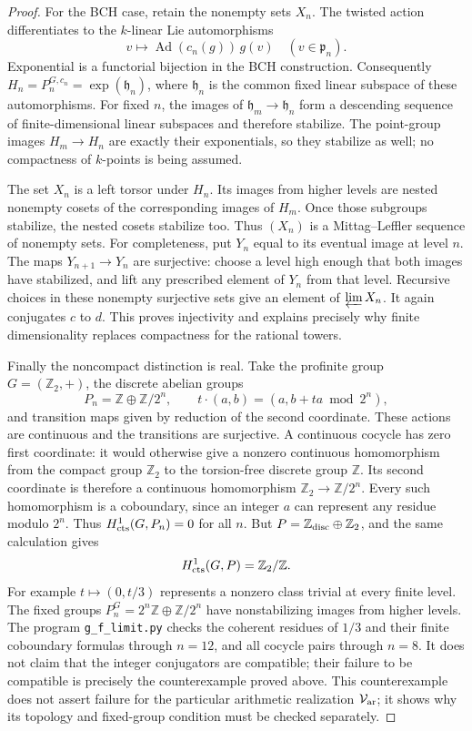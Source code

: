 \begin{proof}
For the BCH case, retain the nonempty sets $X_n$. The twisted
action differentiates to the $k$-linear Lie automorphisms
\[
       v\longmapsto\operatorname{Ad}(c_n(g))\,g(v)
                          \quad(v\in\mathfrak p_n).
\]
Exponential is a functorial bijection in the BCH construction.
Consequently
$H_n=P_n^{G,c_n}=\exp(\mathfrak h_n)$, where
$\mathfrak h_n$ is the common fixed linear subspace of these
automorphisms. For fixed $n$, the images of
$\mathfrak h_m\to\mathfrak h_n$ form a descending sequence
of finite-dimensional linear subspaces and therefore stabilize.
The point-group images $H_m\to H_n$ are exactly their
exponentials, so they stabilize as well; no compactness of
$k$-points is being assumed.

The set $X_n$ is a left torsor under $H_n$. Its images from
higher levels are nested nonempty cosets of the corresponding
images of $H_m$. Once those subgroups stabilize, the nested
cosets stabilize too. Thus $(X_n)$ is a Mittag--Leffler sequence
of nonempty sets. For completeness, put $Y_n$ equal to its
eventual image at level $n$. The maps
$Y_{n+1}\to Y_n$ are surjective: choose a level high enough
that both images have stabilized, and lift any prescribed
element of $Y_n$ from that level. Recursive choices in these
nonempty surjective sets give an element of $\varprojlim X_n$.
It again conjugates $c$ to $d$. This proves injectivity and
explains precisely why finite dimensionality replaces compactness
for the rational towers.

Finally the noncompact distinction is real. Take the profinite
group $G=(\mathbb Z_2,+)$, the discrete abelian groups
\[
 P_n=\mathbb Z\oplus\mathbb Z/2^n,
 \qquad t\cdot(a,b)=(a,b+ta\bmod 2^n),
\]
and transition maps given by reduction of the second coordinate.
These actions are continuous and the transitions are surjective.
A continuous cocycle has zero first coordinate: it would otherwise
give a nonzero continuous homomorphism from the compact group
$\mathbb Z_2$ to the torsion-free discrete group $\mathbb Z$.
Its second coordinate is therefore a continuous homomorphism
$\mathbb Z_2\to\mathbb Z/2^n$. Every such homomorphism is a
coboundary, since an integer $a$ can represent any residue
modulo $2^n$. Thus $H^1_{\rm cts}(G,P_n)=0$ for all $n$.
But $P=\mathbb Z_{\rm disc}\oplus\mathbb Z_2$, and the same
calculation gives
\[
               H^1_{\rm cts}(G,P)=\mathbb Z_2/\mathbb Z.
\]
For example $t\mapsto(0,t/3)$ represents a nonzero class
trivial at every finite level. The fixed groups
$P_n^G=2^n\mathbb Z\oplus\mathbb Z/2^n$ have nonstabilizing
images from higher levels. The program \texttt{g\_f\_limit.py}
checks the coherent residues of $1/3$ and their finite
coboundary formulas through $n=12$, and all cocycle pairs
through $n=8$. It does not claim that the integer conjugators
are compatible; their failure to be compatible is precisely
the counterexample proved above. This counterexample does not assert
failure for the particular arithmetic realization
$\mathcal V_{\rm ar}$; it shows why its topology and fixed-group
condition must be checked separately.
\end{proof}
